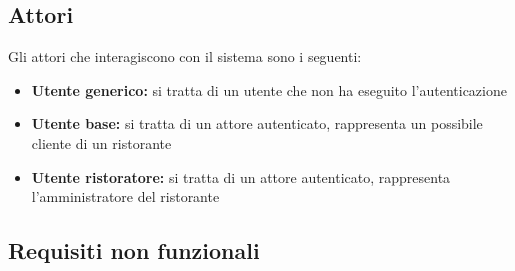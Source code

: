 \subsection{Attori}
Gli attori che interagiscono con il sistema sono i seguenti:
\begin{itemize}
	\item \textbf{Utente generico:} si tratta di un utente che non ha eseguito l'autenticazione
	\item \textbf{Utente base:} si tratta di un attore autenticato, rappresenta un possibile cliente di un ristorante
	\item \textbf{Utente ristoratore:} si tratta di un attore autenticato, rappresenta l'amministratore del ristorante
\end{itemize}

\subsection{Requisiti non funzionali}
